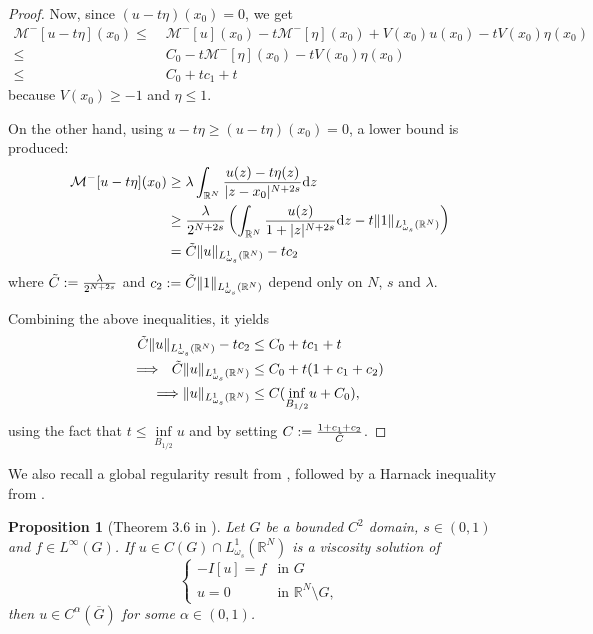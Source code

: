 \documentclass[a4paper,11pt]{article}
\newcommand{\R}{\mathbb{R}}
\newcommand{\M}{\mathcal{M}}
\newcommand{\I}{I}
\newcommand{\Lomega}{L_{\omega_s}^1(\R^N)}
\newcommand{\dz}{\mathrm{d}z}
\newtheorem{proposition}[theorem]{Proposition}
\begin{document}
\begin{proof}
Now, since $(u-t\eta)(x_0)=0$, we get
\begin{align*}
	\M^-[u-t\eta](x_0) \leq &\; \M^-[u](x_0) - t\M^-[\eta](x_0) +V(x_0)u(x_0) - tV(x_0)\eta (x_0) \\
	\leq &\; C_0 - t\M^-[\eta](x_0) - tV(x_0)\eta (x_0)\\
	\leq &\; C_0 + tc_1 + t
\end{align*}
because $V(x_0) \geq -1$ and $\eta \leq 1$.

On the other hand, using $ u-t\eta\ge(u-t\eta)(x_0)=0$,  a lower bound is produced:
\begin{align*}
\M^-[u-t\eta](x_0) &\geq \lambda \int_{\R^N} \frac{u(z) - t\eta(z)}{|z-x_0|^{N+2s}} \dz \\
&\geq \frac{\lambda}{2^{N+2s}} \left(\int_{\R^N} \frac{u(z)}{1+ |z|^{N+2s}}\dz - t\|1\|_{\Lomega} \right) \\
&= \Tilde{C}\|u\|_{\Lomega} - tc_2
\end{align*}
where $\Tilde{C} :=\frac{\lambda}{2^{N+2s}} $ and $c_2 := \Tilde{C}\|1\|_{\Lomega} $ depend only on $N$, $s$ and $\lambda$. 

Combining the above inequalities, it yields
\begin{align*}
\Tilde{C}\|u\|_{\Lomega} - tc_2 &\leq C_0 + tc_1 + t\\
\Longrightarrow~~ \Tilde{C}\|u\|_{\Lomega} &\leq C_0 + t (1 + c_1 + c_2)\\
\Longrightarrow \|u\|_{\Lomega} &\leq C (\underset{B_{1/2}}{\inf}u + C_0),
\end{align*}
using the fact that $t\leq \underset{B_{1/2}}{\inf}u$ and by setting $C:= \frac{1 + c_1 + c_2}{\Tilde{C}}$.
\end{proof}

We also recall a global regularity result from \cite{quaas_principal_2020}, followed by a Harnack inequality from  \cite{Davila-Quaas-Topp-parab}.

\begin{proposition}[Theorem 3.6 in \cite{quaas_principal_2020}]
\label{prop:regularity}
Let $G$ be a bounded $C^2$ domain, $s\in (0,1)$ and $f\in L^{\infty}(G)$. If $u\in C(G) \cap L^1_{\omega_s}(\R^N)$ is a viscosity solution of 
\[\begin{cases}
-\I [u] = f & \text{in }G\\
u=0 & \text{in } \R^N\setminus G,
\end{cases}\]
then $u\in C^{\alpha}(\overline{G})$ for some $\alpha \in (0,1)$.
\end{proposition}
\end{document}
